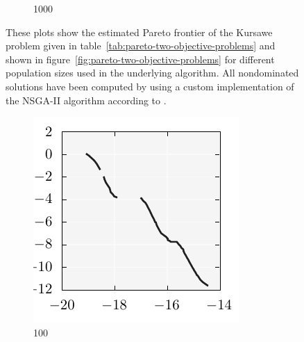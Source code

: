 \documentclass{stdlocal}
\begin{document}
\begin{figure}[t]
\begin{subfigure}[b]{0.24\textwidth}
        \caption{1000}
      \end{subfigure}
      \caption[]{%
        These plots show the estimated Pareto frontier of the Kursawe problem given in table~\ref{tab:pareto-two-objective-problems} and shown in figure~\ref{fig:pareto-two-objective-problems} for different population sizes used in the underlying algorithm.
        All nondominated solutions have been computed by using a custom implementation of the NSGA-II algorithm according to \textcite{deb2002}.
      }
      \label{fig:kursawe-pareto-front-samples}
    \end{figure}

    \begin{figure}[t]
      \center
      \begin{subfigure}[b]{0.24\textwidth}
        \center
        \includegraphics[width=\textwidth]{../../plots/kursawe_100_tessellation.pdf}
        \caption{100}
      \end{subfigure}
      \begin{subfigure}[b]{0.24\textwidth}
        \center

\end{subfigure}
\end{figure}
\end{document}
